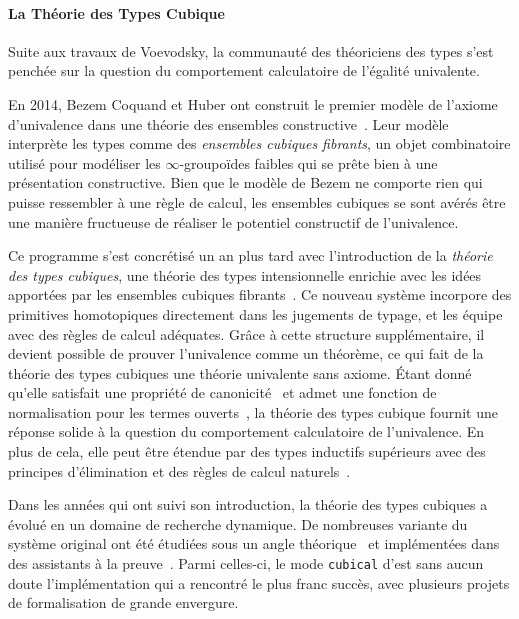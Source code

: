 \paragraph*{La Théorie des Types Cubique}
% 
Suite aux travaux de Voevodsky, la communauté des théoriciens des types
s'est penchée sur la question du comportement calculatoire de l'égalité 
univalente.

En 2014, Bezem Coquand et Huber ont construit le premier modèle de l'axiome d'univalence 
dans une théorie des ensembles constructive~.
% 
Leur modèle interprète les types comme des \emph{ensembles cubiques fibrants}, un 
objet combinatoire utilisé pour modéliser les \( \infty \)-groupoïdes faibles qui se prête 
bien à une présentation constructive. 
% 
Bien que le modèle de Bezem \etal ne comporte rien qui puisse ressembler à une 
règle de calcul, les ensembles cubiques se sont avérés être une manière fructueuse
de réaliser le potentiel constructif de l'univalence.

Ce programme s'est concrétisé un an plus tard avec l'introduction de la 
\emph{théorie des types cubiques}, une théorie des types intensionnelle enrichie 
avec les idées apportées par les ensembles cubiques fibrants~.
% 
Ce nouveau système incorpore des primitives homotopiques directement dans les 
jugements de typage, et les équipe avec des règles de calcul adéquates. 
% 
Grâce à cette structure supplémentaire, il devient possible de prouver 
l'univalence comme un théorème, ce qui fait de la théorie des types cubiques une théorie 
univalente sans axiome.
% 
Étant donné qu'elle satisfait une propriété de canonicité~ et admet 
une fonction de normalisation pour les termes ouverts~, 
la théorie des types cubique fournit une réponse solide à la question du comportement 
calculatoire de l'univalence.
% 
En plus de cela, elle peut être étendue par des types inductifs supérieurs avec des 
principes d'élimination et des règles de calcul naturels~.

Dans les années qui ont suivi son introduction, la théorie des types cubiques a 
évolué en un domaine de recherche dynamique. 
% 
De nombreuses variante du système original ont été étudiées sous un angle 
théorique~\cite{AngiuliHouHarper18,ABCFHL} et implémentées dans des assistants à la 
preuve~\cite{Cubicaltt, redtt}. 
% 
Parmi celles-ci, le mode \texttt{cubical} d'\Agda est sans aucun doute l'implémentation 
qui a rencontré le plus franc succès, avec plusieurs projets de formalisation de 
grande envergure.

